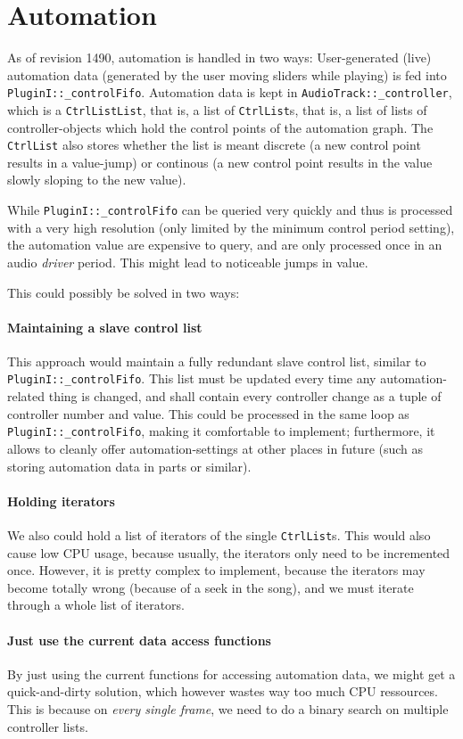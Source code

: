\documentclass[a4paper]{report}
\newcommand{\sym}[1]{\texttt{#1}}
\begin{document}
\section{Automation}
As of revision 1490, automation is handled in two ways: User-generated
(live) automation data (generated by the user moving sliders while playing)
is fed into \sym{PluginI::\_controlFifo}. Automation data is kept
in \sym{AudioTrack::\_controller}, which is a \sym{CtrlListList},
that is, a list of \sym{CtrlList}s, that is, a list of lists of
controller-objects which hold the control points of the automation graph.
The \sym{CtrlList} also stores whether the list is meant discrete
(a new control point results in a value-jump) or continous (a new control
point results in the value slowly sloping to the new value).

While \sym{PluginI::\_controlFifo} can be queried very quickly and
thus is processed with a very high resolution (only limited by the
minimum control period setting), the automation value are expensive to
query, and are only processed once in an audio \emph{driver} period.
This might lead to noticeable jumps in value.

This could possibly be solved in two ways:
\paragraph{Maintaining a slave control list}
This approach would maintain a fully redundant slave control list,
similar to \sym{PluginI::\_controlFifo}. This list must be updated
every time any automation-related thing is changed, and shall contain
every controller change as a tuple of controller number and value.
This could be processed in the same loop as \sym{PluginI::\_controlFifo},
making it comfortable to implement; furthermore, it allows to cleanly
offer automation-settings at other places in future (such as storing
automation data in parts or similar).

\paragraph{Holding iterators}
We also could hold a list of iterators of the single \sym{CtrlList}s.
This would also cause low CPU usage, because usually, the iterators only
need to be incremented once. However, it is pretty complex to implement,
because the iterators may become totally wrong (because of a seek in the
song), and we must iterate through a whole list of iterators.

\paragraph{Just use the current data access functions}
By just using the current functions for accessing automation data,
we might get a quick-and-dirty solution, which however wastes way too
much CPU ressources. This is because on \emph{every single frame}, we
need to do a binary search on multiple controller lists.
\end{document}
